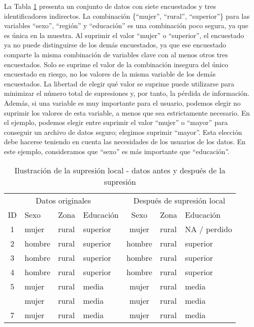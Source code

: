 \documentclass[
]{book}
\theoremstyle{definition}
\theoremstyle{definition}
\theoremstyle{definition}
\theoremstyle{definition}
\theoremstyle{remark}
\begin{document}
La Tabla \ref{tab:Tabla9} presenta un conjunto de datos con siete encuestados y tres identificadores indirectos. La combinación \{``mujer'', ``rural'', ``superior''\} para las variables ``sexo'', ``región'' y ``educación'' es una combinación poco segura, ya que es única en la muestra. Al suprimir el valor ``mujer'' o ``superior'', el encuestado ya no puede distinguirse de los demás encuestados, ya que ese encuestado comparte la misma combinación de variables clave con al menos otros tres encuestados. Solo se suprime el valor de la combinación insegura del único encuestado en riesgo, no los valores de la misma variable de los demás encuestados. La libertad de elegir qué valor se suprime puede utilizarse para minimizar el número total de supresiones y, por tanto, la pérdida de información. Además, si una variable es muy importante para el usuario, podemos elegir no suprimir los valores de esta variable, a menos que sea estrictamente necesario. En el ejemplo, podemos elegir entre suprimir el valor ``mujer'' o ``mayor'' para conseguir un archivo de datos seguro; elegimos suprimir ``mayor''. Esta elección debe hacerse teniendo en cuenta las necesidades de los usuarios de los datos. En este ejemplo, consideramos que ``sexo'' es más importante que ``educación''.

\begin{table}

\caption{\label{tab:Tabla9}\label{tab:Tabla9}Ilustración de la supresión local - datos antes y después de la supresión}
\centering
\begin{tabular}[t]{clllcll}
\toprule
\multicolumn{4}{c}{Datos originales} & \multicolumn{3}{c}{Después de supresión local} \\
\cmidrule(l{3pt}r{3pt}){1-4} \cmidrule(l{3pt}r{3pt}){5-7}
ID & Sexo & Zona & Educación & Sexo & Zona & Educación\\
\midrule
1 & mujer & rural & superior & mujer & rural & NA / perdido\\
2 & hombre & rural & superior & hombre & rural & superior\\
3 & hombre & rural & superior & hombre & rural & superior\\
4 & hombre & rural & superior & hombre & rural & superior\\
5 & mujer & rural & media & mujer & rural & media\\
\addlinespace
6 & mujer & rural & media & mujer & rural & media\\
7 & mujer & rural & media & mujer & rural & media\\
\bottomrule
\end{tabular}
\end{table}
\end{document}
